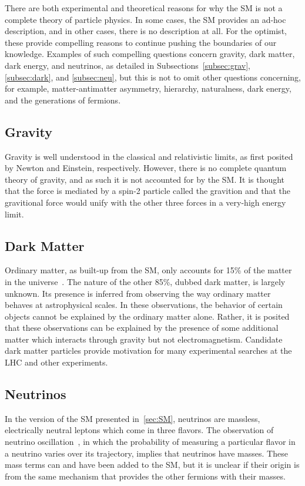 There are both experimental and theoretical reasons for why the SM is not a complete theory of
particle physics. In some cases, the SM provides an ad-hoc description, and in other cases, there
is no description at all. For the optimist, these provide compelling reasons to continue
pushing the boundaries of our knowledge. Examples of such compelling questions concern gravity,
dark matter, dark energy, and neutrinos, as detailed in Subsections~\ref{subsec:grav},
\ref{subsec:dark}, and \ref{subsec:neu}, but this is not to omit other questions concerning,
for example, matter-antimatter asymmetry, hierarchy, naturalness,
dark energy, and the generations of fermions.

\subsection{Gravity\label{subsec:grav}}

Gravity is well understood in the classical and relativistic limits, as first posited by Newton
and Einstein, respectively. However, there is no complete quantum theory of gravity, and as such
it is not accounted for by the SM. It is thought that the force is mediated by a spin-2 particle
called the gravition and that the gravitional force would unify with the other three forces
in a very-high energy limit.

\subsection{Dark Matter\label{subsec:dark}}

Ordinary matter, as built-up from the SM, only accounts for 15\% of the
matter in the universe~\cite{Clowe:2006eq}. The nature of the other 85\%, dubbed dark matter, is
largely unknown. Its presence is inferred from observing the way ordinary matter behaves at
astrophysical scales. In these observations, the behavior of certain objects cannot be explained
by the ordinary matter alone. Rather, it is posited that these observations can be explained by
the presence of some additional matter which interacts through gravity but not electromagnetism.
Candidate dark matter particles provide motivation for many experimental searches at the LHC and
other experiments.

\subsection{Neutrinos\label{subsec:neu}}

In the version of the SM presented in~\ref{sec:SM}, neutrinos are massless, electrically neutral
leptons which come in three flavors. The observation of neutrino oscillation~\cite{Fukuda:1998mi},
in which the probability of measuring a particular flavor in a neutrino varies over its trajectory,
implies that neutrinos have masses. These mass terms can and have been added to the SM, but it is
unclear if their origin is from the same mechanism that provides the other fermions with their
masses.

